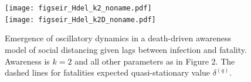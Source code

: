 \begin{figure}[t!]
\begin{center}
\texttt{[image: figseir\_Hdel\_k2\_noname.pdf]}\\
\texttt{[image: figseir\_Hdel\_k2D\_noname.pdf]}
\caption{Emergence of oscillatory dynamics in a death-driven awareness
model of social distancing given lags between infection and fatality.
Awareness is $k=2$ and all other parameters as in Figure 2.
The dashed
lines for fatalities expected quasi-stationary value $\delta^{(q)}$.
\label{fig.oscillate}}
\end{center}
\end{figure}



